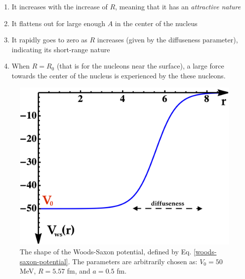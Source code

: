 \begin{enumerate}
    \item It increases with the increase of $R$, meaning that it has an \emph{attractive nature}
    \item It flattens out for large enough $A$ in the center of the nucleus
    \item It rapidly goes to zero as $R$ increases (given by the diffuseness parameter), indicating its short-range nature
    \item When $R=R_0$ (that is for the nucleons near the surface), a large force towards the center of the nucleus is experienced by the these nucleons.
\end{enumerate}
\begin{figure}
    \centering
    \includegraphics[scale=0.2]{Chapters/Figures/ws_potential_plot.png}
    \caption{The shape of the Woods-Saxon potential, defined by Eq. \ref{woods-saxon-potential}. The parameters are arbitrarily chosen as: $V_0=50$ MeV, $R=5.57$ fm, and $a=0.5$ fm.}
    \label{woods-saxon-plot}
\end{figure}

